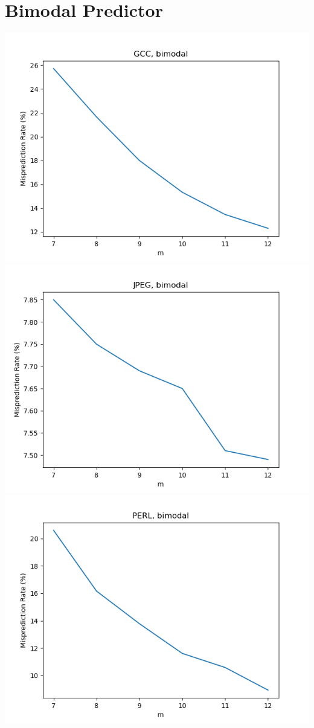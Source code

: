 \documentclass{article}
\begin{document}
    \section{Bimodal Predictor}

    \begin{center}
        
        \includegraphics[scale=0.83]{../graph_logs/GCC_bimodal.png}
        \includegraphics[scale=0.83]{../graph_logs/JPEG_bimodal.png}
        \includegraphics[scale=0.83]{../graph_logs/PERL_bimodal.png}


\end{center}
\end{document}
